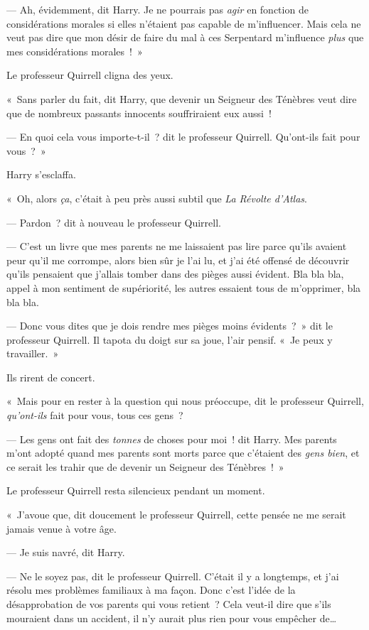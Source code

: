 --- Ah, évidemment, dit Harry.
Je ne pourrais pas \emph{agir} en fonction de considérations morales si elles n'étaient pas capable de m'influencer.
Mais cela ne veut pas dire que mon désir de faire du mal à ces Serpentard m'influence \emph{plus} que mes considérations morales~!~»

Le professeur Quirrell cligna des yeux.

«~Sans parler du fait, dit Harry, que devenir un Seigneur des Ténèbres veut dire que de nombreux passants innocents souffriraient eux aussi~!

--- En quoi cela vous importe-t-il~? dit le professeur Quirrell.
Qu'ont-ils fait pour vous~?~»

Harry s'esclaffa.

«~Oh, alors \emph{ça}, c'était à peu près aussi subtil que \emph{La Révolte d'Atlas}.

--- Pardon~? dit à nouveau le professeur Quirrell.

--- C'est un livre que mes parents ne me laissaient pas lire parce qu'ils avaient peur qu'il me corrompe, alors bien sûr je l'ai lu, et j'ai été offensé de découvrir qu'ils pensaient que j'allais tomber dans des pièges aussi évident.
Bla bla bla, appel à mon sentiment de supériorité, les autres essaient tous de m'opprimer, bla bla bla.

--- Donc vous dites que je dois rendre mes pièges moins évidents~?~»
dit le professeur Quirrell.
Il tapota du doigt sur sa joue, l'air pensif.
«~Je peux y travailler.~»

Ils rirent de concert.

«~Mais pour en rester à la question qui nous préoccupe, dit le professeur Quirrell, \emph{qu'ont-ils} fait pour vous, tous ces gens~?

--- Les gens ont fait des \emph{tonnes} de choses pour moi~! dit Harry.
Mes parents m'ont adopté quand mes parents sont morts parce que c'étaient des \emph{gens bien}, et ce serait les trahir que de devenir un Seigneur des Ténèbres~!~»

Le professeur Quirrell resta silencieux pendant un moment.

«~J'avoue que, dit doucement le professeur Quirrell, cette pensée ne me serait jamais venue à votre âge.

--- Je suis navré, dit Harry.

--- Ne le soyez pas, dit le professeur Quirrell.
C'était il y a longtemps, et j'ai résolu mes problèmes familiaux à ma façon.
Donc c'est l'idée de la désapprobation de vos parents qui vous retient~?
Cela veut-il dire que s'ils mouraient dans un accident, il n'y aurait plus rien pour vous empêcher de…

